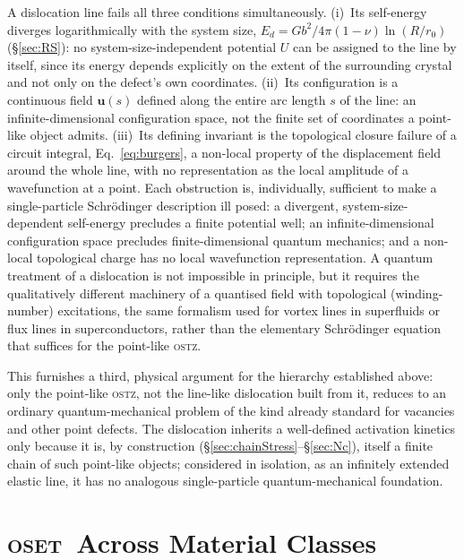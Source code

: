 \documentclass[3p]{elsarticle}
\newcommand{\OSTZ}{\textsc{ostz}}
\newcommand{\OSET}{\textsc{oset}}
\begin{document}
A dislocation line fails all three conditions simultaneously.
(i)~Its self-energy diverges logarithmically with the system size,
$E_d=Gb^2/4\pi(1-\nu)\ln(R/r_0)$ (\S\ref{sec:RS}): no
system-size-independent potential $U$ can be assigned to the line by
itself, since its energy depends explicitly on the extent of the
surrounding crystal and not only on the defect's own coordinates.
(ii)~Its configuration is a continuous field $\mathbf u(s)$ defined
along the entire arc length $s$ of the line: an
infinite-dimensional configuration space, not the finite set of
coordinates a point-like object admits. (iii)~Its defining
invariant is the topological closure failure of a circuit integral,
Eq.~\eqref{eq:burgers}, a non-local property of the displacement
field around the whole line, with no representation as the local
amplitude of a wavefunction at a point. Each obstruction is,
individually, sufficient to make a single-particle Schr\"odinger
description ill posed: a divergent, system-size-dependent
self-energy precludes a finite potential well; an
infinite-dimensional configuration space precludes finite-dimensional
quantum mechanics; and a non-local topological charge has no local
wavefunction representation. A quantum treatment of a dislocation is
not impossible in principle, but it requires the qualitatively
different machinery of a quantised field with topological
(winding-number) excitations, the same formalism used for vortex
lines in superfluids or flux lines in superconductors, rather
than the elementary Schr\"odinger equation that suffices for the
point-like \OSTZ.

This furnishes a third, physical argument for the hierarchy
established above: only the point-like \OSTZ, not the line-like
dislocation built from it, reduces to an ordinary
quantum-mechanical problem of the kind already standard for vacancies
and other point defects. The dislocation inherits a well-defined
activation kinetics only because it is, by construction
(\S\ref{sec:chainStress}--\S\ref{sec:Nc}), itself a finite chain of
such point-like objects; considered in isolation, as an
infinitely extended elastic line, it has no analogous
single-particle quantum-mechanical foundation.

\section{\OSET\ Across Material Classes}
\label{sec:classes}
\end{document}
